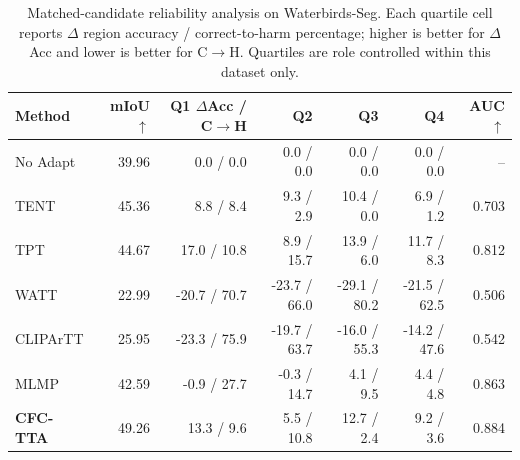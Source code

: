 \begin{table}[t]
\centering
\scriptsize
\setlength{\tabcolsep}{3.2pt}
\caption{Matched-candidate reliability analysis on Waterbirds-Seg. Each quartile cell reports $\Delta$ region accuracy / correct-to-harm percentage; higher is better for $\Delta$Acc and lower is better for C$\rightarrow$H. Quartiles are role controlled within this dataset only.}
\label{tab:source-risk-waterbirds-seg}
\begin{tabular}{lrrrrrr}
\toprule
Method & mIoU $\uparrow$ & Q1 $\Delta$Acc / C$\rightarrow$H & Q2 & Q3 & Q4 & AUC $\uparrow$ \\
\midrule
No Adapt & 39.96 & 0.0 / 0.0 & 0.0 / 0.0 & 0.0 / 0.0 & 0.0 / 0.0 & -- \\
TENT & 45.36 & 8.8 / 8.4 & 9.3 / 2.9 & 10.4 / 0.0 & 6.9 / 1.2 & 0.703 \\
TPT & 44.67 & 17.0 / 10.8 & 8.9 / 15.7 & 13.9 / 6.0 & 11.7 / 8.3 & 0.812 \\
WATT & 22.99 & -20.7 / 70.7 & -23.7 / 66.0 & -29.1 / 80.2 & -21.5 / 62.5 & 0.506 \\
CLIPArTT & 25.95 & -23.3 / 75.9 & -19.7 / 63.7 & -16.0 / 55.3 & -14.2 / 47.6 & 0.542 \\
MLMP & 42.59 & -0.9 / 27.7 & -0.3 / 14.7 & 4.1 / 9.5 & 4.4 / 4.8 & 0.863 \\
\textbf{CFC-TTA} & 49.26 & 13.3 / 9.6 & 5.5 / 10.8 & 12.7 / 2.4 & 9.2 / 3.6 & 0.884 \\
\bottomrule
\end{tabular}
\end{table}
